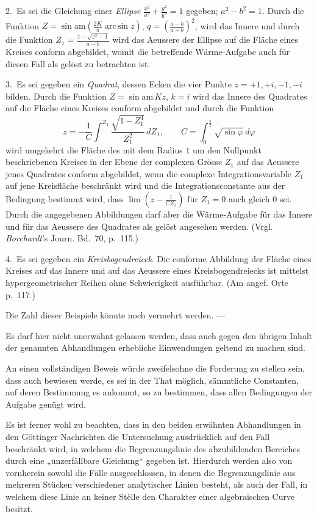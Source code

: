\documentclass{article}
\begin{document}
2.~Es sei die Gleichung einer \emph{Ellipse} $\frac{x^2}{a^2} + \frac{y^2}{b^2} = 1$ gegeben; $a^2 - b^2 = 1$. Durch die Funktion $Z = \sin\mathrm{am}\left(\frac{2K}{\pi} \operatorname{arc\,sin} z\right)$, $q = \left(\frac{a - b}{a + b}\right)^2$, wird das Innere und durch die Funktion $Z_1 = \frac{z - \sqrt{z^2 - 1}}{a - b}$ wird das Aeussere der Ellipse auf die Fläche eines Kreises conform abgebildet, womit die betreffende Wärme-Aufgabe auch für diesen Fall als gelöst zu betrachten ist.

3.~Es sei gegeben ein \emph{Quadrat}, dessen Ecken
die vier Punkte $z = +1, +i, -1, -i$ bilden. Durch die Funktion $Z = \sin\mathrm{am}\, Kz$, $k = i$ wird das Innere des Quadrates auf die Fläche eines Kreises conform abgebildet und durch die Funktion
\[
z = -\frac{1}{C} \int^{Z_1} \frac{\sqrt{1 - Z_1^4}}{Z_1^2} \, dZ_1, \qquad C = \int_0^{\frac{\pi}{2}} \sqrt{\sin\varphi} \, d\varphi
\]
wird umgekehrt die Fläche des mit dem Radius $1$ um den Nullpunkt beschriebenen Kreises in der Ebene der complexen Grösse $Z_1$ auf das Aeussere jenes Quadrates conform abgebildet, wenn die complexe Integrationsvariable $Z_1$ auf jene Kreisfläche beschränkt wird und die Integrationsconstante aus der Bedingung bestimmt wird, dass $\lim \left(z - \frac{1}{CZ_1}\right)$ für $Z_1 = 0$ auch gleich $0$ sei. Durch die angegebenen Abbildungen darf aber die Wärme-Aufgabe für das Innere und für das Aeussere des Quadrates als gelöst angesehen werden. (Vrgl. \emph{Borchardt}'s Journ. Bd.~70, p.~115.)

4.~Es sei gegeben ein \emph{Kreisbogendreieck}. Die conforme Abbildung der Fläche eines Kreises auf das Innere und auf das Aeussere eines Kreisbogendreiecks ist mittelst hypergeometrischer Reihen ohne Schwierigkeit ausführbar. (Am angef. Orte p.~117.)

Die Zahl dieser Beispiele könnte noch vermehrt werden. ---

Es darf hier nicht unerwähnt gelassen werden, dass auch gegen den übrigen Inhalt der genannten Abhandlungen erhebliche Einwendungen geltend zu machen sind.

An einen vollständigen Beweis würde zweifelsohne die Forderung zu stellen sein, dass auch
bewiesen werde, es sei in der That möglich, sämmtliche Constanten, auf deren Bestimmung es ankommt, so zu bestimmen, dass allen Bedingungen der Aufgabe genügt wird.

Es ist ferner wohl zu beachten, dass in den beiden erwähnten Abhandlungen in den Göttinger Nachrichten die Untersuchung ausdrücklich auf den Fall beschränkt wird, in welchem die Begrenzungslinie des abzubildenden Bereiches durch eine „unzerfällbare Gleichung“ gegeben ist. Hierdurch werden also von vornherein sowohl die Fälle ausgeschlossen, in denen die Begrenzungslinie aus mehreren Stücken verschiedener analytischer Linien besteht, als auch der Fall, in welchem diese Linie an keiner Stèlle den Charakter einer algebraischen Curve besitzt.
\end{document}
